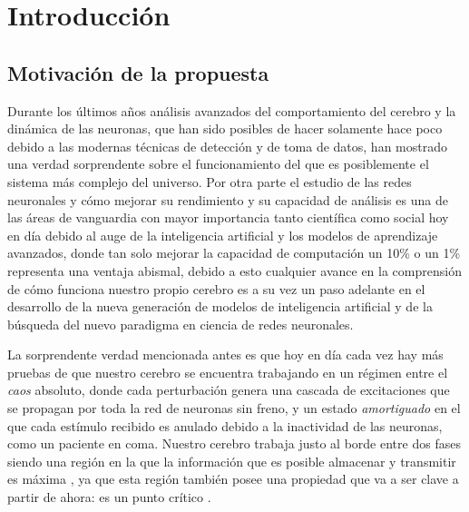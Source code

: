 \documentclass[11pt,a4paper,twoside,pdf]{article}
\numberwithin{equation}{section}
\begin{document}
\tableofcontents
\newpage

\section{Introducción}
\subsection{Motivación de la propuesta}
Durante los últimos años análisis avanzados del comportamiento del cerebro y la dinámica de las neuronas, que han sido posibles de hacer solamente hace poco debido a las modernas técnicas de detección y de toma de datos, han mostrado una verdad sorprendente sobre el funcionamiento del que es posiblemente el sistema más complejo del universo. Por otra parte el estudio de las redes neuronales y cómo mejorar su rendimiento y su capacidad de análisis es una de las áreas de vanguardia con mayor importancia tanto científica como social hoy en día debido al auge de la inteligencia artificial y los modelos de aprendizaje avanzados, donde tan solo mejorar la capacidad de computación un 10\% o un 1\% representa una ventaja abismal, debido a esto cualquier avance en la comprensión de cómo funciona nuestro propio cerebro es a su vez un paso adelante en el desarrollo de la nueva generación de modelos de inteligencia artificial y de la búsqueda del nuevo paradigma en ciencia de redes neuronales. 

La sorprendente verdad mencionada antes es que hoy en día cada vez hay más pruebas de que nuestro cerebro se encuentra trabajando en un régimen entre el \emph{caos} absoluto, donde cada perturbación genera una cascada de excitaciones que se propagan por toda la red de neuronas sin freno, y un estado \emph{amortiguado} en el que cada estímulo recibido es anulado debido a la inactividad de las neuronas, como un paciente en coma. Nuestro cerebro trabaja justo al borde entre dos fases \parencite{beggs2003} siendo una región en la que la información que es posible almacenar y transmitir es máxima \parencite{shew2011}, ya que esta región también posee una propiedad que va a ser clave a partir de ahora: es un punto crítico \parencite{shew2013}.
\end{document}
